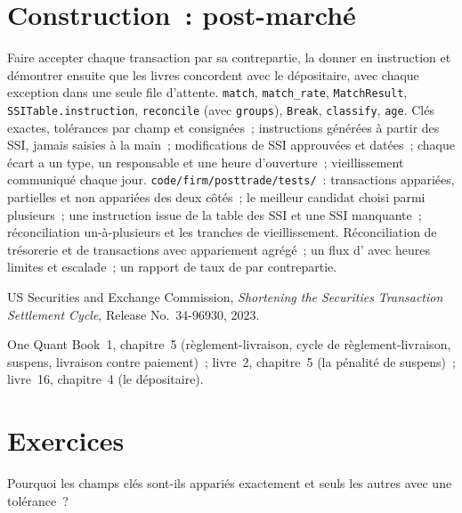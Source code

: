 \section{Construction~: post-marché}\label{bld:pl:post-trade-systems:posttrade}

\begin{build}
 Faire accepter chaque transaction par sa contrepartie, la donner en instruction et démontrer ensuite que les livres concordent avec le dépositaire, avec chaque
exception dans une seule file d'attente.
 \texttt{match}, \texttt{match\_rate}, \texttt{MatchResult}, \texttt{SSITable.instruction}, \texttt{reconcile} (avec
\texttt{groups}), \texttt{Break}, \texttt{classify}, \texttt{age}.
 Clés exactes, tolérances par champ et consignées~; instructions générées à partir des SSI, jamais saisies à la main~; modifications de SSI approuvées et datées~;
chaque écart a un type, un responsable et une heure d'ouverture~; vieillissement communiqué chaque jour.
 \texttt{code/firm/posttrade/tests/}~: transactions appariées, partielles et non appariées des deux côtés~; le meilleur candidat choisi
parmi plusieurs~; une instruction issue de la table des SSI et une SSI manquante~; réconciliation un-à-plusieurs et les tranches de vieillissement.
 Réconciliation de trésorerie et de transactions avec appariement agrégé~; un flux d' avec heures limites et escalade~; un
rapport de taux de  par contrepartie.
\end{build}

\begin{omsources}
\item US Securities and Exchange Commission, \emph{Shortening the Securities Transaction Settlement Cycle}, Release No.~34-96930, 2023.
\item One Quant Book~1, chapitre~5 (règlement-livraison, cycle de règlement-livraison, suspens, livraison contre paiement)~; livre~2, chapitre~5 (la pénalité de suspens)~;
livre~16, chapitre~4 (le dépositaire).
\end{omsources}

\section{Exercices}

\begin{exercise}[$\star$]\label{exo:pl:post-trade-systems:1}
Pourquoi les champs clés sont-ils appariés exactement et seuls les autres avec une tolérance~?
\end{exercise}

